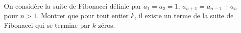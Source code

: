 On considère la suite de Fibonacci définie par $a_1 = a_2 = 1$, $a_{n+1} = a_{n-1} + a_n$ pour $n > 1$. Montrer que pour tout entier $k$, il existe un terme de la suite de Fibonacci qui se termine par $k$ zéros.
